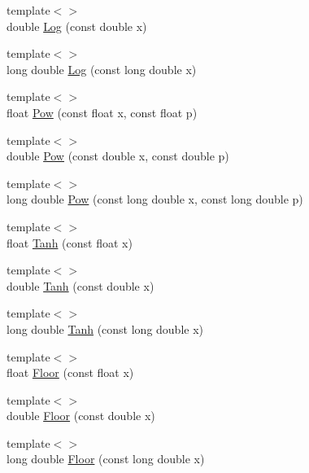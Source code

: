 \begin{DoxyCompactItemize}
\item 
{\footnotesize template$<$$>$ }\\double \hyperlink{centroidalifold_2contrafold_2_utilities_8ipp_a12cdc7ac8943e306f00e1608e1d5b92d}{Log} (const double x)
\item 
{\footnotesize template$<$$>$ }\\long double \hyperlink{centroidalifold_2contrafold_2_utilities_8ipp_a0c97d604a39ae6416b2cd3cb9ac3e72a}{Log} (const long double x)
\item 
{\footnotesize template$<$$>$ }\\float \hyperlink{centroidalifold_2contrafold_2_utilities_8ipp_ae4f509181dd7a42e98267e3f0ef18c8d}{Pow} (const float x, const float p)
\item 
{\footnotesize template$<$$>$ }\\double \hyperlink{centroidalifold_2contrafold_2_utilities_8ipp_aafa41a71b0aa28c33527782582947a82}{Pow} (const double x, const double p)
\item 
{\footnotesize template$<$$>$ }\\long double \hyperlink{centroidalifold_2contrafold_2_utilities_8ipp_a953211ef1495e3dc51dcb8339c678d4a}{Pow} (const long double x, const long double p)
\item 
{\footnotesize template$<$$>$ }\\float \hyperlink{centroidalifold_2contrafold_2_utilities_8ipp_a24d55b16cddfc4fe0af075f240b25540}{Tanh} (const float x)
\item 
{\footnotesize template$<$$>$ }\\double \hyperlink{centroidalifold_2contrafold_2_utilities_8ipp_adb1c85d0bda6cf2001ffe68905e75449}{Tanh} (const double x)
\item 
{\footnotesize template$<$$>$ }\\long double \hyperlink{centroidalifold_2contrafold_2_utilities_8ipp_a2bf8ddaeb4bd14a5fa1f7cf5956226f5}{Tanh} (const long double x)
\item 
{\footnotesize template$<$$>$ }\\float \hyperlink{centroidalifold_2contrafold_2_utilities_8ipp_a64f07f7a1670dbc6301e28ed189d5c5b}{Floor} (const float x)
\item 
{\footnotesize template$<$$>$ }\\double \hyperlink{centroidalifold_2contrafold_2_utilities_8ipp_a4120c652cf61384339b11d3e5fc7be23}{Floor} (const double x)
\item 
{\footnotesize template$<$$>$ }\\long double \hyperlink{centroidalifold_2contrafold_2_utilities_8ipp_a26259e203b171dd19e6e2c4191c44930}{Floor} (const long double x)

\end{DoxyCompactItemize}
